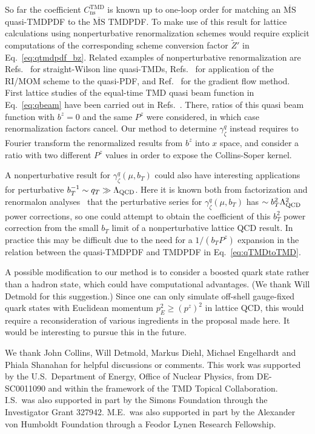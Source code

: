 \documentclass[prd,aps,twocolumn,bibnotes,nofootinbib,preprintnumbers,floatfix]{revtex4-1}
\DeclareRobustCommand{\eq}[1]{Eq.~\eqref{eq:#1}}
\DeclareRobustCommand{\mycite}[1]{Ref.~\cite{#1}}
\DeclareRobustCommand{\mycites}[1]{Refs.~\cite{#1}}
\newcommand{\LQCD}{\Lambda_{\rm QCD}}
\newcommand{\MS}{\overline{\mathrm{MS}}}
\newcommand{\ns}{{\text{ns}}}
\newcommand\TMD{\mathrm{TMD}}
\begin{document}
So far the coefficient $C_\ns^\TMD$ is known up to one-loop order for matching an $\MS$ quasi-TMDPDF to the $\MS$ TMDPDF.
To make use of this result for lattice calculations using nonperturbative renormalization schemes would require explicit computations of the corresponding scheme conversion factor $\tilde Z'$ in \eq{qtmdpdf_bz}. Related examples of nonperturbative renormalization are \mycites{Hagler:2009mb,Musch:2010ka} for straight-Wilson line quasi-TMDs,  \mycites{Constantinou:2017sej,Stewart:2017tvs} for application of the RI/MOM scheme to the quasi-PDF, and \mycite{Monahan:2016bvm} for the gradient flow method.
First lattice studies of the equal-time TMD quasi beam function in \eq{qbeam} have been carried out in \mycites{Musch:2011er,Engelhardt:2015xja,Yoon:2016dyh,Yoon:2017qzo}. There, ratios of this quasi beam function with $b^z=0$ and the same $P^z$ were considered, in which case renormalization factors cancel.
Our method to determine $\gamma_\zeta^q$ instead requires to Fourier transform the renormalized results from $b^z$ into $x$ space, and consider a ratio with two different $P^z$ values in order to expose the Collins-Soper kernel. 

A nonperturbative result for $\gamma_\zeta^q(\mu,b_T)$ could also have interesting applications for perturbative $b_T^{-1}\sim q_T\gg \LQCD$. Here it is known both from factorization and renormalon analyses~\cite{Becher:2013iya,Scimemi:2016ffw} that the perturbative series for $\gamma_\zeta^q(\mu,b_T)$ has $\sim b_T^2 \Lambda_{\rm QCD}^2$ power corrections, so one could attempt to obtain the coefficient of this $b_T^2$ power correction from the small $b_T$ limit of a nonperturbative lattice QCD result. In practice this may be difficult due to the need for a $1/(b_T P^z)$ expansion in the relation between the quasi-TMDPDF and TMDPDF in \eq{qTMDtoTMD}.

A possible modification to our method is to consider a boosted quark state rather than a hadron state, which could have computational advantages.
(We thank Will Detmold for this suggestion.)
Since one can only simulate off-shell gauge-fixed quark states with Euclidean momentum $p_E^2 \ge (p^z)^2$ in lattice QCD, this would require a reconsideration of various ingredients in the proposal made here. It would be interesting to pursue this in the future.

\begin{acknowledgments}
We thank John Collins, Will Detmold, Markus Diehl, Michael Engelhardt and Phiala Shanahan for helpful discussions or comments.
This work was supported by the U.S.\ Department of Energy,
Office of Nuclear Physics, from DE-SC0011090
and within the framework of the TMD Topical Collaboration.
I.S.\ was also supported in part by the Simons Foundation through
the Investigator Grant 327942.
M.E.\ was also supported in part by the Alexander von Humboldt Foundation
through a Feodor Lynen Research Fellowship.
\end{acknowledgments}
\end{document}
